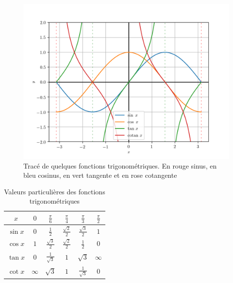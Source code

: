 %
\begin{figure}
  \centering
  \includegraphics[scale=0.6]{trig.png}
  \caption[Tracé de quelques fonctions trigonométriques]{Tracé de quelques fonctions trigonométriques. En rouge sinus, en bleu cosinus, en vert tangente et en rose cotangente}
  \label{fig:tracetrigo}
\end{figure}
%
\renewcommand{\arraystretch}{2.2}
\begin{table}
  \centering
  \begin{tabular}{|c|c|c|c|c|c|}
    \hline
    \(\displaystyle x\)& \(\displaystyle 0\)&\(\displaystyle \frac{\pi}{6}\)&\(\displaystyle \frac{\pi}{4}\)&\(\displaystyle \frac{\pi}{3}\)&\(\displaystyle \frac{\pi}{2}\)\\ \hline
    \(\displaystyle \sin x\) &\(\displaystyle  0\) &\(\displaystyle  \frac{1}{2}\) &\(\displaystyle  \frac{\sqrt{2}}{2}\) & \(\displaystyle \frac{\sqrt{3}}{2}\) &\(\displaystyle  1 \)\\ \hline
    \(\displaystyle \cos x\) &\(\displaystyle  1 \)&\(\displaystyle \frac{\sqrt{3}}{2}\) & \(\displaystyle \frac{\sqrt{2}}{2}\) & \(\displaystyle \frac{1}{2}\) & \(\displaystyle 0\) \\ \hline
    \(\displaystyle \tan x\) & \(\displaystyle  0 \)&\(\displaystyle \frac{1}{\sqrt{3}}\) & \(\displaystyle 1\) & \(\displaystyle \sqrt{3}\) & \(\displaystyle \infty\) \\ \hline
    \(\displaystyle \cot x\) & \(\displaystyle \infty\) & \(\displaystyle \sqrt{3}\) &\(\displaystyle  1\) & \(\displaystyle \frac{1}{\sqrt{3}}\) &\(\displaystyle  0\)\\ \hline
  \end{tabular}
  \caption{Valeurs particulières des fonctions trigonométriques}
  \label{tab:valeurpart}
\end{table}
\renewcommand{\arraystretch}{1}
